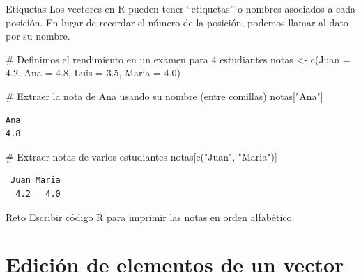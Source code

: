 \documentclass[
  ignorenonframetext,
  aspectratio=169,
  spanish,
]{beamer}
\newenvironment{Shaded}{\begin{snugshade}}{\end{snugshade}}
\newcommand{\AttributeTok}[1]{\textcolor[rgb]{0.40,0.45,0.13}{#1}}
\newcommand{\CommentTok}[1]{\textcolor[rgb]{0.37,0.37,0.37}{#1}}
\newcommand{\FloatTok}[1]{\textcolor[rgb]{0.68,0.00,0.00}{#1}}
\newcommand{\FunctionTok}[1]{\textcolor[rgb]{0.28,0.35,0.67}{#1}}
\newcommand{\NormalTok}[1]{\textcolor[rgb]{0.00,0.23,0.31}{#1}}
\newcommand{\OtherTok}[1]{\textcolor[rgb]{0.00,0.23,0.31}{#1}}
\newcommand{\StringTok}[1]{\textcolor[rgb]{0.13,0.47,0.30}{#1}}
\begin{document}
\begin{frame}[fragile]{Etiquetas}
\label{etiquetas}
Los vectores en R pueden tener ``etiquetas'' o nombres asociados a cada
posición. En lugar de recordar el número de la posición, podemos llamar
al dato por su nombre.

\begin{Shaded}
\begin{Highlighting}[]
\CommentTok{\# Definimos el rendimiento en un examen para 4 estudiantes}
\NormalTok{notas }\OtherTok{\textless{}{-}} \FunctionTok{c}\NormalTok{(}\AttributeTok{Juan =} \FloatTok{4.2}\NormalTok{, }\AttributeTok{Ana =} \FloatTok{4.8}\NormalTok{, }\AttributeTok{Luis =} \FloatTok{3.5}\NormalTok{, }\AttributeTok{Maria =} \FloatTok{4.0}\NormalTok{)}

\CommentTok{\# Extraer la nota de Ana usando su nombre (entre comillas)}
\NormalTok{notas[}\StringTok{"Ana"}\NormalTok{]}
\end{Highlighting}
\end{Shaded}

\begin{verbatim}
Ana 
4.8 
\end{verbatim}

\begin{Shaded}
\begin{Highlighting}[]
\CommentTok{\# Extraer notas de varios estudiantes}
\NormalTok{notas[}\FunctionTok{c}\NormalTok{(}\StringTok{"Juan"}\NormalTok{, }\StringTok{"Maria"}\NormalTok{)]}
\end{Highlighting}
\end{Shaded}

\begin{verbatim}
 Juan Maria 
  4.2   4.0 
\end{verbatim}
\end{frame}

\begin{frame}{Reto}
\label{reto}
Escribir código R para imprimir las notas en orden alfabético.
\end{frame}

\section{Edición de elementos de un
vector}\label{ediciuxf3n-de-elementos-de-un-vector}
\end{document}
